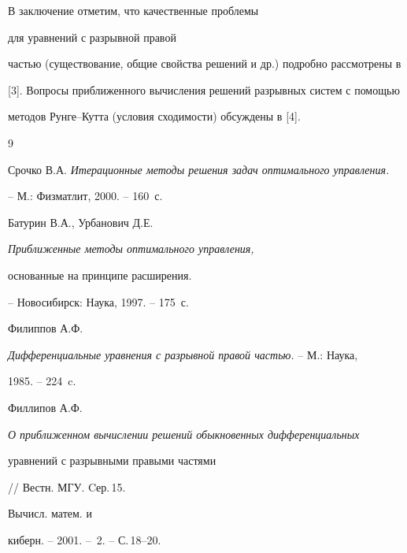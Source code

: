 В заключение отметим, что качественные проблемы 


для уравнений с разрывной правой 


частью (существование, общие свойства решений и др.) подробно рассмотрены в 


[3]. Вопросы приближенного вычисления решений разрывных систем с помощью 


методов Рунге--Кутта (условия сходимости) обсуждены в [4].





\begin{thebibliography}{9}







Срочко В.А. {\it Итерационные методы решения задач оптимального управления.} 


-- М.: Физ\-мат\-лит, 2000. -- 160~с.







Батурин В.А., Урбанович Д.Е. {\it Приближенные методы оптимального управления, 


основанные на принципе расширения.} -- Новосибирск: Наука, 1997. -- 175~с.





 Филиппов А.Ф.


{\it Дифференциальные уравнения с разрывной правой частью.} -- М.: Наука, 


1985. -- 224~c.





 Филлипов А.Ф.


{\it О приближенном вычислении решений обыкновенных дифференциальных 


уравнений с разрывными правыми частями} // Вестн. МГУ. Cер.\,15. 


Вычисл. матем. и 


киберн. -- 2001. -- \No\,2. -- С.\,18--20.





\end{thebibliography}





\vskip 2cm












\label{end}





